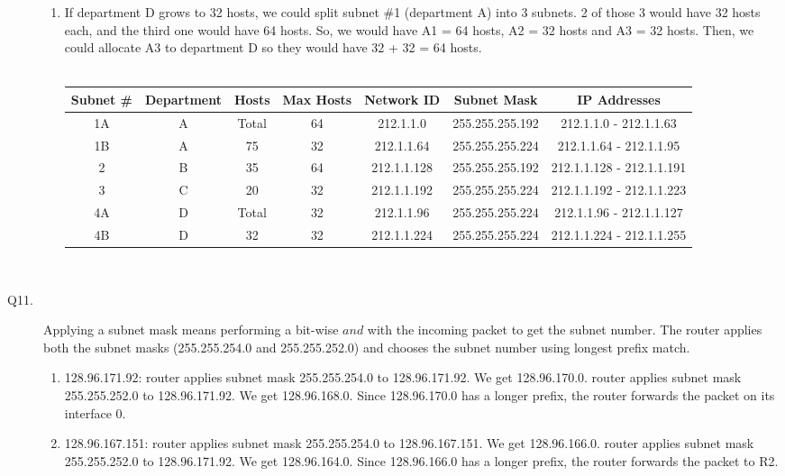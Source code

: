 \documentclass{csc_assignment}
\begin{document}
\begin{description}
\begin{enumerate}
\item If department D grows to 32 hosts, we could split subnet \#1 (department A) into 3 subnets. 2 of those 3 would have 32 hosts each, and the third one would have 64 hosts. So, we would have A1 = 64 hosts, A2 = 32 hosts and A3 = 32 hosts. Then, we could allocate A3 to department D so they would have 32 + 32 = 64 hosts. \\\\
\begin{tabular}{ |c|c|c|c|c|c|c| }
\hline
	Subnet \# & Department & Hosts & Max Hosts & Network ID & Subnet Mask & IP Addresses \\
	\hline
	1A & A & Total & 64 & 212.1.1.0 & 255.255.255.192 & 212.1.1.0 - 212.1.1.63 \\
	1B & A & 75 & 32 & 212.1.1.64 & 255.255.255.224 & 212.1.1.64 - 212.1.1.95 \\
	\hline
	2 & B & 35 & 64 & 212.1.1.128 & 255.255.255.192 & 212.1.1.128 - 212.1.1.191 \\
	\hline
	3 & C & 20 & 32 & 212.1.1.192 & 255.255.255.224 & 212.1.1.192 - 212.1.1.223 \\
	\hline
	4A & D & Total & 32 & 212.1.1.96 & 255.255.255.224 & 212.1.1.96 - 212.1.1.127 \\
	4B & D &  32 & 32 & 212.1.1.224 & 255.255.255.224 & 212.1.1.224 - 212.1.1.255 \\
	\hline
\end{tabular} \\
\end{enumerate}


\item[Q11.]
Applying a subnet mask means performing a bit-wise $and$ with the incoming packet to get the subnet number. The router applies both the subnet masks (255.255.254.0 and 255.255.252.0) and chooses the subnet number using longest prefix match.
\begin{enumerate}
\item 128.96.171.92: router applies subnet mask 255.255.254.0 to 128.96.171.92. We get 128.96.170.0. router applies subnet mask 255.255.252.0 to 128.96.171.92. We get 128.96.168.0. Since 128.96.170.0 has a longer prefix, the router forwards the packet on its interface 0.
 
\item 128.96.167.151: router applies subnet mask 255.255.254.0 to 128.96.167.151. We get 128.96.166.0. router applies subnet mask 255.255.252.0 to 128.96.171.92. We get 128.96.164.0. Since 128.96.166.0 has a longer prefix, the router forwards the packet to R2. 


\end{enumerate}
\end{description}
\end{document}
